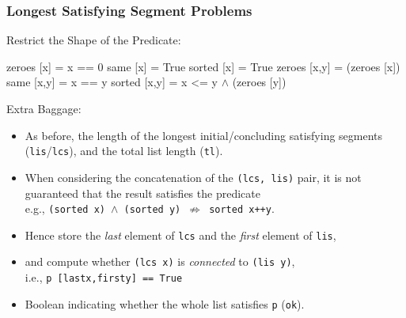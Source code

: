 \documentclass{beamer}
\newcommand{\emp}[1]{\textcolor{DikuRed}{ #1}}
\newcommand{\mymath}[1]{$ #1 $}
\begin{document}
\begin{frame}[fragile,t]
  \frametitle{Longest Satisfying Segment Problems}

\begin{block}{Restrict the Shape of the Predicate:}
\begin{colorcode}
zeroes [x]   = x == 0           same [x]   = True     sorted [x]   = True
zeroes [x,y] =  (zeroes [x])    same [x,y] = x == y   sorted [x,y] = x <= y
              \mymath{\wedge} (zeroes [y])
\end{colorcode}
\end{block} 

\bigskip
Extra Baggage:
\begin{itemize}
    \item As before, the \emp{length} of the longest initial/concluding  satisfying segments ({\tt lis}/{\tt lcs}),
            and the total list length ({\tt tl}).
    \item When considering the concatenation of the {\tt (lcs, lis)} pair, it is not guaranteed that the
            result satisfies the predicate \\
            e.g., {\tt (sorted x) $\wedge$ (sorted y) $\not\Rightarrow$ sorted x++y}.  
    \item Hence store the {\em last} element of {\tt lcs} and the {\em first} element of {\tt lis},
    \item and compute whether {\tt (lcs x)} is {\em connected} to {\tt (lis y)}, \\ i.e., {\tt p [lastx,firsty] == True}
    \item Boolean indicating whether the whole list satisfies {\tt p} ({\tt ok}).
\end{itemize}
\end{frame}
\end{document}
